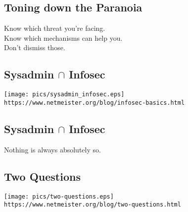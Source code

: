 \documentclass[xga]{xdvislides}
\begin{document}
\subsection{Toning down the Paranoia}
\vspace*{\fill}
\Huge
\begin{center}
Know which threat you're facing. \\
\vspace{.25in}
Know which mechanisms can help you. \\
Don't dismiss those.
\end{center}
\Normalsize
\vspace*{\fill}



\subsection{Sysadmin $\cap$ Infosec}
\vspace*{\fill}
\begin{center}
	\texttt{[image: pics/sysadmin\_infosec.eps]} \\
	\verb+https://www.netmeister.org/blog/infosec-basics.html+
\end{center}
\vspace*{\fill}

\subsection{Sysadmin $\cap$ Infosec}
\vspace*{\fill}
\Huge
\begin{center}
	Nothing is always absolutely so.
\end{center}
\Normalsize
\vspace*{\fill}

\subsection{Two Questions}
\vspace*{\fill}
\begin{center}
	\texttt{[image: pics/two-questions.eps]} \\
\small
	\verb+https://www.netmeister.org/blog/two-questions.html+
\end{center}
\Normalsize
\vspace*{\fill}
\end{document}
